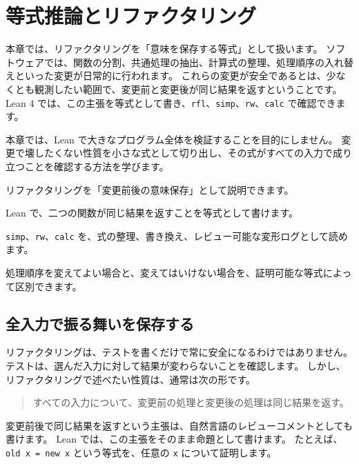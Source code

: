 \chapter{等式推論とリファクタリング}
\label{chap:ch09_equality_refactoring}

\begin{chapterabstract}
本章では、リファクタリングを「意味を保存する等式」として扱います。
ソフトウェアでは、関数の分割、共通処理の抽出、計算式の整理、処理順序の入れ替えといった変更が日常的に行われます。
これらの変更が安全であるとは、少なくとも観測したい範囲で、変更前と変更後が同じ結果を返すということです。
Lean 4 では、この主張を等式として書き、\texttt{rfl}、\texttt{simp}、\texttt{rw}、\texttt{calc} で確認できます。

本章では、Lean で大きなプログラム全体を検証することを目的にしません。
変更で壊したくない性質を小さな式として切り出し、その式がすべての入力で成り立つことを確認する方法を学びます。
\end{chapterabstract}

\begin{learninggoals}
\item リファクタリングを「変更前後の意味保存」として説明できます。
\item Lean で、二つの関数が同じ結果を返すことを等式として書けます。
\item \texttt{simp}、\texttt{rw}、\texttt{calc} を、式の整理、書き換え、レビュー可能な変形ログとして読めます。
\item 処理順序を変えてよい場合と、変えてはいけない場合を、証明可能な等式によって区別できます。
\end{learninggoals}

\section{全入力で振る舞いを保存する}

リファクタリングは、テストを書くだけで常に安全になるわけではありません。
テストは、選んだ入力に対して結果が変わらないことを確認します。
しかし、リファクタリングで述べたい性質は、通常は次の形です。

\begin{quote}
すべての入力について、変更前の処理と変更後の処理は同じ結果を返す。
\end{quote}

変更前後で同じ結果を返すという主張は、自然言語のレビューコメントとしても書けます。
Lean では、この主張をそのまま命題として書けます。
たとえば、\texttt{old x = new x} という等式を、任意の \texttt{x} について証明します。

